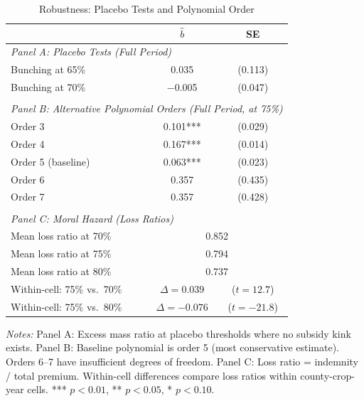 \begin{table}[htbp]
\centering
\caption{Robustness: Placebo Tests and Polynomial Order}
\label{tab:robust}
\begin{threeparttable}
\begin{tabular}{lcc}
\toprule
& $\hat{b}$ & SE \\
\midrule
\multicolumn{3}{l}{\textit{Panel A: Placebo Tests (Full Period)}} \\[3pt]
Bunching at 65\% & 0.035 & (0.113) \\
Bunching at 70\% & $-$0.005 & (0.047) \\
\\
\multicolumn{3}{l}{\textit{Panel B: Alternative Polynomial Orders (Full Period, at 75\%)}} \\[3pt]
Order 3 & 0.101*** & (0.029) \\
Order 4 & 0.167*** & (0.014) \\
Order 5 (baseline) & 0.063*** & (0.023) \\
Order 6 & 0.357 & (0.435) \\
Order 7 & 0.357 & (0.428) \\
\\
\multicolumn{3}{l}{\textit{Panel C: Moral Hazard (Loss Ratios)}} \\[3pt]
Mean loss ratio at 70\% & \multicolumn{2}{c}{0.852} \\
Mean loss ratio at 75\% & \multicolumn{2}{c}{0.794} \\
Mean loss ratio at 80\% & \multicolumn{2}{c}{0.737} \\
Within-cell: 75\% vs.\ 70\% & $\Delta = 0.039$ & ($t = 12.7$) \\
Within-cell: 75\% vs.\ 80\% & $\Delta = -0.076$ & ($t = -21.8$) \\
\bottomrule
\end{tabular}
\begin{tablenotes}[flushleft]
\footnotesize
\item \textit{Notes:} Panel A: Excess mass ratio at placebo thresholds where no subsidy kink exists. Panel B: Baseline polynomial is order 5 (most conservative estimate). Orders 6--7 have insufficient degrees of freedom. Panel C: Loss ratio = indemnity / total premium. Within-cell differences compare loss ratios within county-crop-year cells. *** $p<0.01$, ** $p<0.05$, * $p<0.10$.
\end{tablenotes}
\end{threeparttable}
\end{table}
